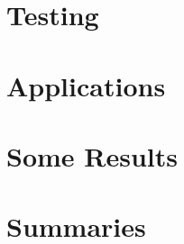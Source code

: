 \documentclass[3pt]{ctexart}
\begin{document}


\clearpage

\section{\label{sec:Testing}Testing}



\clearpage

\section{\label{sec:Applications}Applications}















\clearpage

\section{\label{sec:SomeResults}Some Results}











\clearpage

\section{\label{sec:Summaries}Summaries}





\clearpage

\printindex



\end{document}
